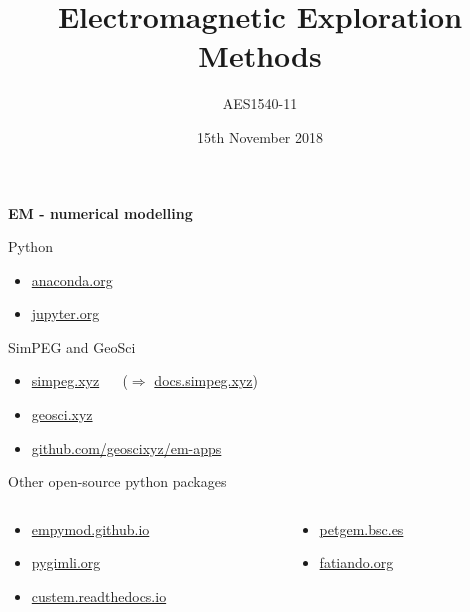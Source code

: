 \documentclass[xcolor=svgnames, serif, 10pt]{beamer}
\author{AES1540-11}
\title{Electromagnetic Exploration Methods}
\date{15th November 2018}
\begin{document}
\begin{frame}
  \centering
  {\color{DarkBlue}\Large \sffamily \bfseries EM - numerical modelling}

  \raggedright
  \vfill

  \begin{block}{Python}
    \begin{itemize}
      \item \href{https://www.anaconda.com/distribution/\#download-section}%
        {anaconda.org}
      \item \href{https://jupyter.org}{jupyter.org}
    \end{itemize}
  \end{block}

  \vfill

  \begin{block}{SimPEG and GeoSci}
    \begin{itemize}
      \item \href{https://simpeg.xyz}{simpeg.xyz}
        $\quad$ ($\Rightarrow$ \href{https://docs.simpeg.xyz}{docs.simpeg.xyz})
      \item \href{https://geosci.xyz}{geosci.xyz}
      \item \href{https://github.com/geoscixyz/em-apps}%
        {github.com/geoscixyz/em-apps}
    \end{itemize}
  \end{block}

  \vfill

  \begin{block}{Other open-source python packages}
    \begin{columns}
      \begin{column}{0.5\linewidth}
      \begin{itemize}
          \item \href{https://empymod.github.io}{empymod.github.io}
          \item \href{https://www.pygimli.org}{pygimli.org}
          \item \href{https://custem.readthedocs.io}{custem.readthedocs.io}
        \end{itemize}
      \end{column}
      \begin{column}{0.5\linewidth}
      \begin{itemize}
          \item \href{http://petgem.bsc.es}{petgem.bsc.es}
          \item \href{https://www.fatiando.org}{fatiando.org}
        \end{itemize}
      \end{column}
    \end{columns}
  \end{block}

\end{frame}
\end{document}
